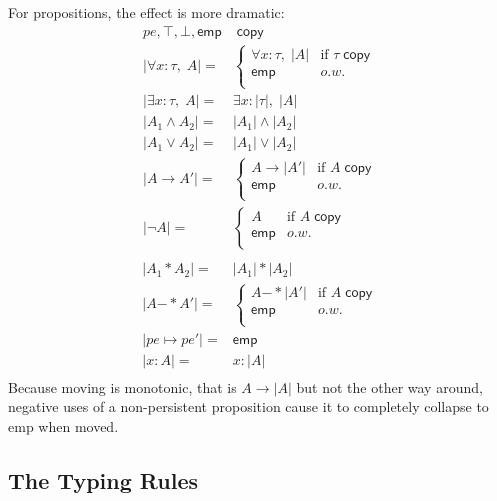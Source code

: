 \documentclass[acmsmall,nonacm]{acmart}
\newcommand{\wand}{\mathrel{-\!\!\ast}}
\newcommand{\core}[1]{\left| #1 \right|}
\begin{document}
For propositions, the effect is more dramatic:
\begin{align*}
  pe,\top,\bot,\mathsf{emp}&\;\mathsf{copy}\\
  \core{\forall x:\tau,\;A}={}& \begin{cases}
    \forall x:\tau,\;\core A&\mbox{if $\tau\;\mathsf{copy}$}\\
    \mathsf{emp}&o.w.\\
  \end{cases}\\
  \core{\exists x:\tau,\;A}={}&\exists x:\core\tau,\;\core A\\
  \core{A_1\land A_2}={}&\core{A_1}\land \core{A_2}\\
  \core{A_1\lor A_2}={}&\core{A_1}\lor \core{A_2}\\
  \core{A\to A'}={}& \begin{cases}
    A\to \core{A'}&\mbox{if $A\;\mathsf{copy}$}\\
    \mathsf{emp}&o.w.\\
  \end{cases}\\
  \core{\neg A}={}& \begin{cases}
    A&\mbox{if $A\;\mathsf{copy}$}\\
    \mathsf{emp}&o.w.\\
  \end{cases}\\
\end{align*}
\begin{align*}
  \core{A_1\ast A_2}={}&\core{A_1}\ast \core{A_2}\\
  \core{A\wand A'}={}& \begin{cases}
    A\wand \core{A'}&\mbox{if $A\;\mathsf{copy}$}\\
    \mathsf{emp}&o.w.\\
  \end{cases}\\
  \core{pe\mapsto pe'}={}&\mathsf{emp}\\
  \core{\boxed{x:A}}={}&\boxed{x:\core{A}}\\
\end{align*}
Because moving is monotonic, that is $A\to \core A$ but not the other way around, negative uses of a non-persistent proposition cause it to completely collapse to \textsf{emp} when moved.

\subsection{The Typing Rules}
\end{document}
